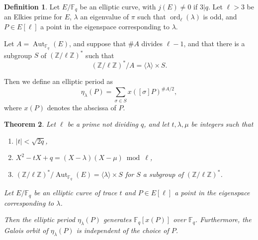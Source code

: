 \documentclass[12pt]{article}
\theoremstyle{plain}
\newtheorem{theorem}{Theorem}
\theoremstyle{definition}
\newtheorem{definition}[theorem]{Definition}
\DeclareMathOperator{\order}{ord} %
\DeclareMathOperator{\Aut}{Aut}
\def\Z{\ensuremath{\mathbb{Z}}}
\def\F{\ensuremath{\mathbb{F}}}
\begin{document}
\begin{definition}
\label{definition:ellperiod}
Let $E/\F_q$ be an elliptic curve, with $j(E)\ne0$ if $3|q$.
Let $\ell > 3$ be an Elkies prime for $E$,
$\lambda$ an eigenvalue of $\pi$ such that $\order_\ell(\lambda)$ is odd,
and $P \in E[\ell]$ a point in the eigenspace corresponding
to $\lambda$.

Let $A=\Aut_{\F_q}(E)$, and suppose that $\# A$ divides $\ell - 1$,
and that there is a subgroup $S$ of $(\Z/\ell\Z)^{\ast}$ such that
\begin{equation}
(\Z/\ell\Z)^{\ast} / A = \langle{\lambda}\rangle \times S.
\end{equation}

Then we define an elliptic period as
\begin{equation}
\eta_\lambda(P) = \sum_{\sigma\in S} {x \left([\sigma] P \right)^{\# A/2}},
\end{equation}
where $x(P)$ denotes the abscissa of $P$.
\end{definition}

\begin{theorem}
\label{theorem:ellperiods}
Let $\ell$ be a prime not dividing $q$, and let $t, \lambda, \mu$ be
integers such that
\begin{enumerate}
    \item $\lvert t \rvert < \sqrt{2q}$,
    \item $X^2 - tX + q = (X - \lambda)(X - \mu)\bmod \ell$,
    \item $(\Z/\ell\Z)^{\ast}/\Aut_{\F_q}(E) = \langle{\lambda}\rangle \times S$
for $S$ a subgroup of $(\Z/\ell\Z)^{\ast}$.
\end{enumerate}

Let $E/\F_q$ be an elliptic curve of trace $t$
and $P \in E[\ell]$ a point in the eigenspace
corresponding to $\lambda$.

Then the elliptic period $\eta_\lambda(P)$ generates $\F_q[x(P)]$ over
$\F_q$.  Furthermore, the Galois orbit of $\eta_\lambda(P)$ is
independent of the choice of $P$.
\end{theorem}
\end{document}
